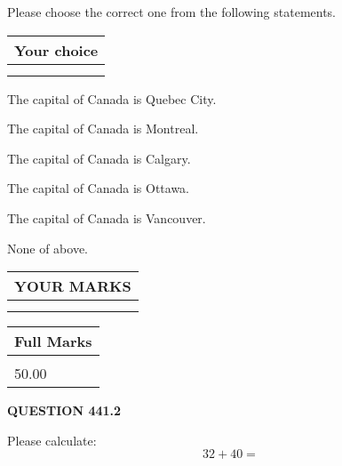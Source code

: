 \documentclass[12pt]{article}
\begin{document}
  
Please choose the correct one from the following statements.
  
  
\noindent\hspace{3.0in} \begin{tabular}{|l|}
\hline
Your choice \\
\hline
 \\ 
 \\ 
\hline
\end{tabular}
  
  
 
 
The capital of Canada is Quebec City.
 
 
The capital of Canada is Montreal.
 
 
The capital of Canada is Calgary.
 
 
The capital of Canada is Ottawa.
 
 
The capital of Canada is Vancouver.
 
 
 None of above.
 
 
  
\vspace{0.2in}
  
\noindent\begin{tabular}{|l|}
\hline
 YOUR MARKS  \\
\hline
 \\ 
 \\ 
\hline
\end{tabular}
\hspace{0.05in} \begin{tabular}{|l|}
\hline
 Full Marks  \\
\hline
 \\ 
50.00 \\
\hline
\end{tabular}
{\textbf{\Large{QUESTION
441.2 
}}}
  
  
 
Please calculate:
\begin{equation}
32 +  %
40 = \nonumber
\end{equation}
 

 

 
   
   
 \vspace{0.2in}
 
   
   
   
   
\end{document}
